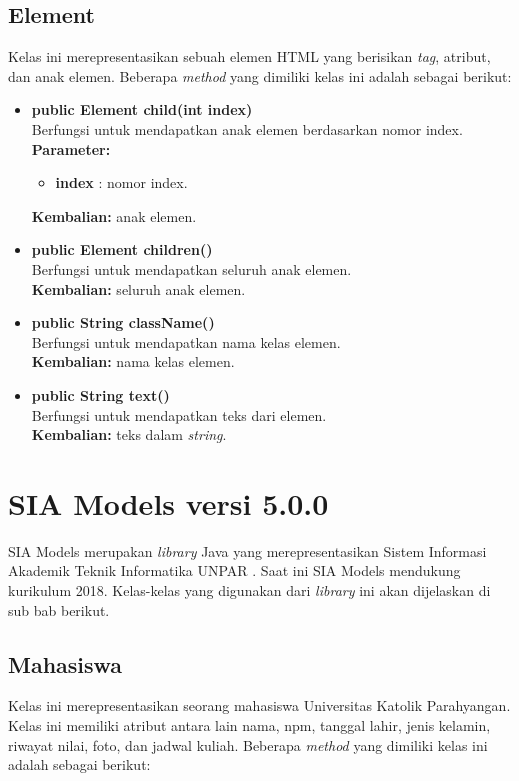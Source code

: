 \subsection{Element}

Kelas ini merepresentasikan sebuah elemen HTML yang berisikan \textit{tag}, atribut, dan anak elemen. Beberapa \textit{method} yang dimiliki kelas ini adalah sebagai berikut:
\begin{itemize}
	\item \textbf{public Element child(int index)} \\
		Berfungsi untuk mendapatkan anak elemen berdasarkan nomor index. \\
		\textbf{Parameter:} 
		\begin{itemize}
			\item \textbf{index} : nomor index.
		\end{itemize}
		\textbf{Kembalian:} anak elemen.	
		
		\item \textbf{public Element children()} \\
		Berfungsi untuk mendapatkan seluruh anak elemen. \\
		\textbf{Kembalian:} seluruh anak elemen.	
		
		\item \textbf{public String className()} \\
		Berfungsi untuk mendapatkan nama kelas elemen. \\
		\textbf{Kembalian:} nama kelas elemen.	
		
		\item \textbf{public String text()} \\
		Berfungsi untuk mendapatkan teks dari elemen. \\
		\textbf{Kembalian:} teks dalam \textit{string}.	
\end{itemize}

\section{SIA Models versi 5.0.0}
SIA Models merupakan \textit{library} Java yang merepresentasikan Sistem Informasi Akademik Teknik Informatika UNPAR \cite{siamodels}. Saat ini SIA Models mendukung kurikulum 2018. Kelas-kelas yang digunakan dari \textit{library} ini akan dijelaskan di sub bab berikut.

\subsection{Mahasiswa}
Kelas ini merepresentasikan seorang mahasiswa Universitas Katolik Parahyangan. Kelas ini memiliki atribut antara lain nama, npm, tanggal lahir, jenis kelamin, riwayat nilai, foto, dan jadwal kuliah. Beberapa \textit{method} yang dimiliki kelas ini adalah sebagai berikut:

